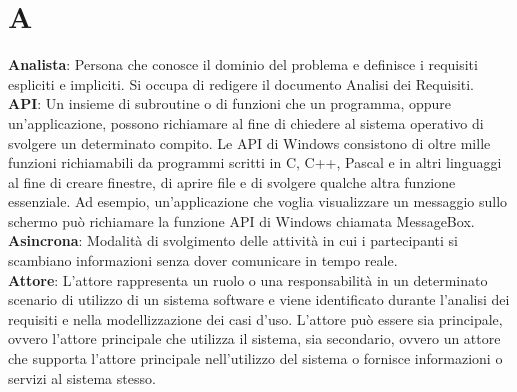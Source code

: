 \section*{A}
\textbf{Analista}: Persona che conosce il dominio del problema e definisce i requisiti espliciti e impliciti. Si occupa di redigere il documento Analisi dei Requisiti.\\
\textbf{API}: Un insieme di subroutine o di funzioni che un programma, oppure un'applicazione, possono richiamare al fine di chiedere al sistema operativo
di svolgere un determinato compito. Le API di Windows consistono di oltre mille funzioni richiamabili da programmi scritti in C, C++,
Pascal e in altri linguaggi al fine di creare finestre, di aprire file e di svolgere qualche altra funzione essenziale. Ad esempio, un'applicazione 
che voglia visualizzare un messaggio sullo schermo può richiamare la funzione API di Windows chiamata MessageBox.\\
\textbf{Asincrona}: Modalità di svolgimento delle attività in cui i partecipanti si scambiano informazioni senza dover comunicare in tempo reale.\\
\textbf{Attore}: L'attore rappresenta un ruolo o una responsabilità in un determinato scenario di utilizzo di un sistema software e viene identificato durante l'analisi dei requisiti e nella modellizzazione dei casi d'uso. L'attore può essere sia principale, ovvero l'attore principale che utilizza il sistema, sia secondario, ovvero un attore che supporta l'attore principale nell'utilizzo del sistema o fornisce informazioni o servizi al sistema stesso.\\
